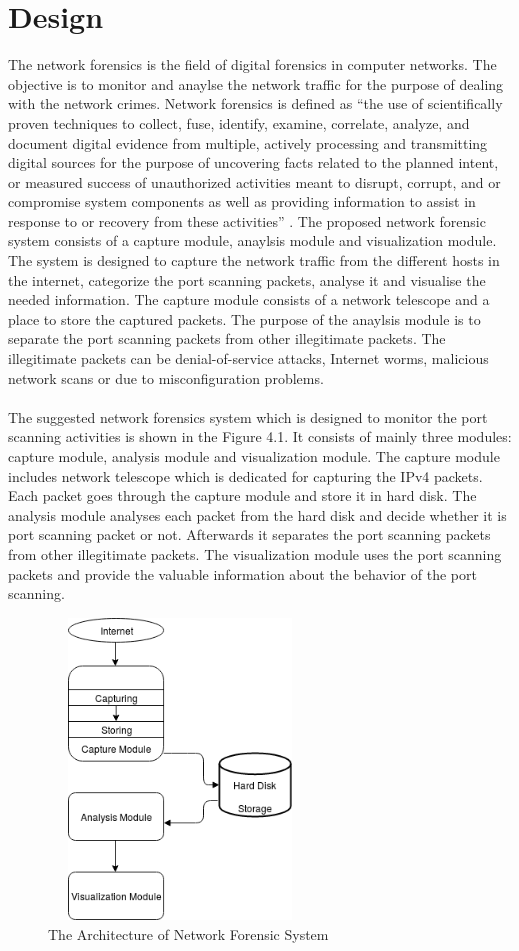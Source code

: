 \chapter{Design}
The network forensics is the field of digital forensics in computer networks.
The objective is to monitor and anaylse the network traffic for the purpose of dealing with the network crimes.
Network forensics is defined as “the use of scientifically
proven techniques to collect, fuse, identify, examine, correlate, analyze, and document digital evidence from multiple, actively processing and transmitting digital sources for the purpose of uncovering facts related to the planned intent, or measured success of unauthorized activities meant to disrupt, corrupt, and or compromise system components as well as providing information to assist in response to or recovery from these activities” \cite{palmer2001road}.
The proposed network forensic system consists of a capture module, anaylsis module and visualization module.
The system is designed to capture the network traffic from the different hosts in the internet, categorize the port scanning packets, analyse it and visualise the needed information.
The capture module consists of a network telescope and a place to store the captured packets.
The purpose of the anaylsis module is to separate the port  scanning packets from other illegitimate packets.
The illegitimate packets can be denial-of-service attacks, Internet worms, malicious network scans or due to misconfiguration problems.\\\\ 
The suggested network forensics system which is designed to monitor the port scanning activities is shown in the Figure 4.1.
It consists of mainly three modules: capture module, analysis module and visualization module.
The capture module includes network telescope which is dedicated for capturing the IPv4 packets.
Each packet goes through the capture module and store it in hard disk.
The analysis module analyses each packet from the hard disk and decide whether it is port scanning packet or not. 
Afterwards it separates the port scanning packets from other illegitimate packets.
The visualization module uses the port scanning packets and provide the valuable information about the behavior of the port scanning.
\begin{figure}[t]
    \centering
	\includegraphics[width=7cm, height=8cm]{images/networkforensic_arch}
	\caption{ The Architecture of Network Forensic System}
\end{figure}
